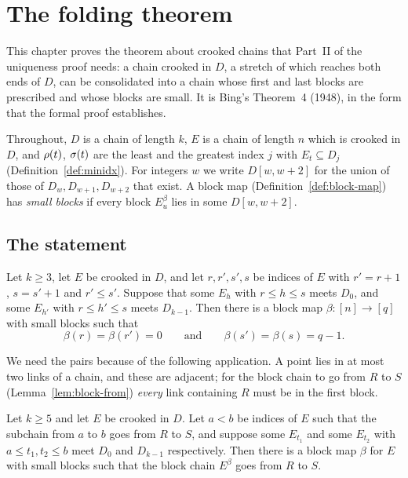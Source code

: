 \chapter{The folding theorem}\label{ch:folding}

This chapter proves the theorem about crooked chains that Part~II of the uniqueness proof needs: a
chain crooked in $D$, a stretch of which reaches both ends of $D$, can be consolidated into a chain
whose first and last blocks are prescribed and whose blocks are small. It is Bing's Theorem~4 (1948),
in the form that the formal proof establishes.

Throughout, $D$ is a chain of length $k$, $E$ is a chain of length $n$ which is crooked in $D$, and
$\rho(t)$, $\sigma(t)$ are the least and the greatest index $j$ with $E_t\subseteq D_j$
(Definition~\ref{def:minidx}). For integers $w$ we write $D[w,w+2]$ for the union of those of
$D_w,D_{w+1},D_{w+2}$ that exist. A block map (Definition~\ref{def:block-map}) has \emph{small
blocks} if every block $E^\beta_u$ lies in some $D[w,w+2]$.

\section{The statement}

\begin{theorem}\label{thm:folding}
Let $k\ge3$, let $E$ be crooked in $D$, and let $r,r',s',s$ be indices of $E$ with $r'=r+1$, $s=s'+1$ and
$r'\le s'$. Suppose that some $E_h$ with $r\le h\le s$ meets $D_0$, and some $E_{h'}$ with $r\le h'\le s$
meets $D_{k-1}$. Then there is a block map $\beta\colon[n]\to[q]$ with small blocks such that
\[
\beta(r)=\beta(r')=0\qquad\text{and}\qquad\beta(s')=\beta(s)=q-1 .
\]
\end{theorem}


We need the pairs because of the following application. A point lies in at most two links of a chain, and
these are adjacent; for the block chain to go from $R$ to $S$ (Lemma~\ref{lem:block-from}) \emph{every} link
containing $R$ must be in the first block.

\begin{corollary}\label{cor:block-chain}
Let $k\ge5$ and let $E$ be crooked in $D$. Let $a<b$ be indices of $E$ such that the subchain from $a$ to $b$
goes from $R$ to $S$, and suppose some $E_{t_1}$ and some $E_{t_2}$ with $a\le t_1,t_2\le b$ meet $D_0$ and $D_{k-1}$
respectively. Then there is a block map $\beta$ for $E$ with small blocks such that the block chain $E^\beta$ goes
from $R$ to $S$.
\end{corollary}

